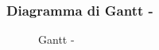 \documentclass[./PianoDiProgetto.tex]{subfiles}
\begin{document}
  \subsubsection{Diagramma di Gantt - \PerV}
    \begin{figure}[!h]
    \centering
    \caption{Gantt - \PerV}
    \end{figure}
\end{document}

